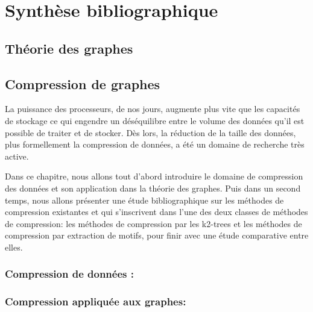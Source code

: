 \documentclass[a4paper,oneside,12pt]{report}
\renewcommand{\headrulewidth}{0pt} %
\renewcommand{\headrulewidth}{0pt}%
\renewcommand{\headrulewidth}{0.4pt}
\theoremstyle{definition}
\begin{document}
	\cleardoublepage
\pagestyle{fancy}
\fancypagestyle{plain}{%
  \fancyhf{}%
  \renewcommand{\headrulewidth}{0pt}%
  \fancyhf[lef,rof]{\thepage}%
}
\renewcommand{\headrulewidth}{0.4pt}
\fancyhead[R]{\rightmark}

\part{Synthèse bibliographique}
	\chapter{ Théorie des graphes}
	  
	

	\chapter{Compression de graphes}
	La puissance des processeurs, de nos jours, augmente plus vite que les capacités de stockage ce qui engendre un déséquilibre entre le volume des données qu'il est possible de
traiter et de stocker. Dès lors, la réduction de la taille des données, plus formellement la compression de données, a été un domaine de recherche très active. 
		
		 Dans ce chapitre, nous allons tout d’abord introduire le domaine de compression des données et son application dans la théorie des graphes. Puis dans un second
temps, nous allons présenter une étude bibliographique sur les méthodes de compression existantes  et qui s'inscrivent dans l'une des deux classes de méthodes de compression: les méthodes de compression par les k2-trees et les méthodes de compression par extraction de motifs, pour finir avec une étude comparative entre elles.
	
		
		\section{Compression de données :}
		
			
		
		\section{Compression appliquée aux graphes:}
			
			
\end{document}
